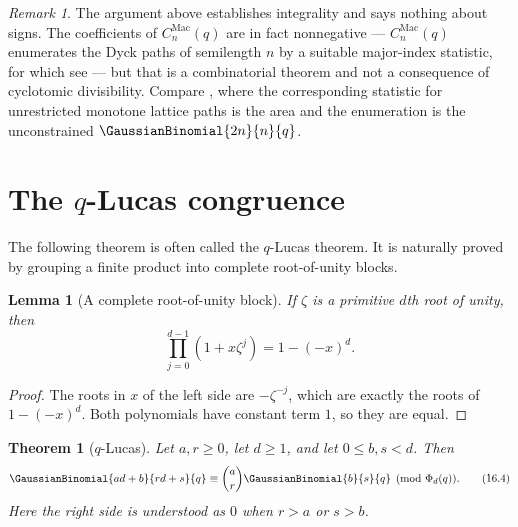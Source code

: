 \documentclass[11pt,a4paper,oneside,openany]{book}
\newtheorem{theorem}{Theorem}[chapter]
\newtheorem{lemma}[lemma]{Lemma}
\theoremstyle{definition}
\theoremstyle{remark}
\newtheorem{remark}[remark]{Remark}
\newcommand{\MacMahonQCatalanPolynomial}[2]{%
  C^{\mathrm{Mac}}_{#1}\!\left(#2\right)}
\begin{document}
\begin{remark}\label{rem:q-catalan-positivity}
The argument above establishes integrality and says nothing about signs.  The
coefficients of $\MacMahonQCatalanPolynomial{n}{q}$ are in fact nonnegative ---
$\MacMahonQCatalanPolynomial{n}{q}$ enumerates the
Dyck paths of semilength $n$ by a suitable major-index statistic, for which
see \cite{Stanley1999} --- but that is a combinatorial theorem and not a
consequence of cyclotomic divisibility.  Compare , where
the corresponding statistic for unrestricted monotone lattice paths is the
area and the enumeration is the unconstrained $\GaussianBinomial{2n}{n}{q}$.
\end{remark}

\section{The \texorpdfstring{$q$}{q}-Lucas congruence}

The following theorem is often called the $q$-Lucas theorem.  It is naturally proved by grouping a finite product into complete root-of-unity blocks.

\begin{lemma}[A complete root-of-unity block]\label{lem:root-block}
If $\zeta$ is a primitive $d$th root of unity, then
\[
 \prod_{j=0}^{d-1}(1+x\zeta^j)=1-(-x)^d.
 \tag{16.3}\label{eq:root-block}
\]
\end{lemma}

\begin{proof}
The roots in $x$ of the left side are $-\zeta^{-j}$, which are exactly the roots of $1-(-x)^d$.  Both polynomials have constant term $1$, so they are equal.
\end{proof}

\begin{theorem}[$q$-Lucas]\label{thm:q-lucas}
Let $a,r\ge0$, let $d\ge1$, and let $0\le b,s<d$.  Then
\[
 \GaussianBinomial{ad+b}{rd+s}{q}
 \equiv
 \binom ar\GaussianBinomial{b}{s}{q}
 \pmod{\Phi_d(q)}.
 \tag{16.4}\label{eq:q-lucas}
\]
Here the right side is understood as $0$ when $r>a$ or $s>b$.
\end{theorem}
\end{document}
